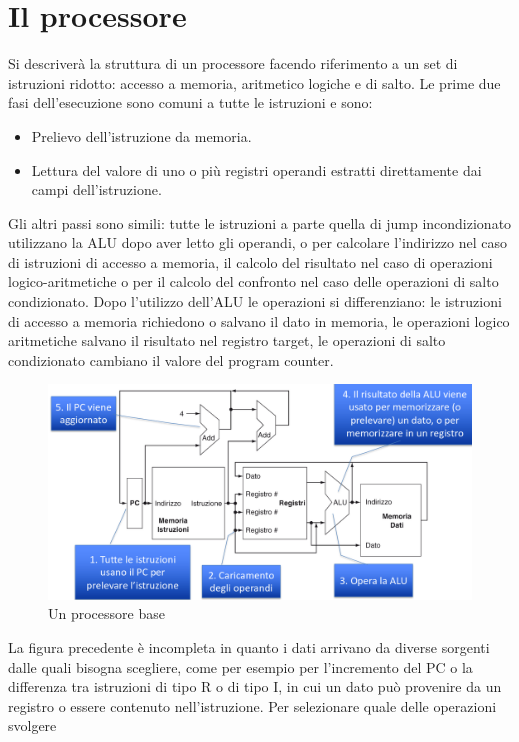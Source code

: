\chapter{Il processore}
Si descriver\`a la struttura di un processore facendo riferimento a un set di istruzioni ridotto: accesso a memoria, aritmetico logiche e di salto. Le prime due fasi
dell'esecuzione sono comuni a tutte le istruzioni e sono:
\begin{itemize}
\item Prelievo dell'istruzione da memoria.
\item Lettura del valore di uno o pi\`u registri operandi estratti direttamente dai campi dell'istruzione. 
\end{itemize}
Gli altri passi sono simili: tutte le istruzioni a parte quella di jump incondizionato utilizzano la ALU dopo aver letto gli operandi, o per calcolare l'indirizzo nel
caso di istruzioni di accesso a memoria, il calcolo del risultato nel caso di operazioni logico-aritmetiche o per il calcolo del confronto nel caso delle operazioni di 
salto condizionato. Dopo l'utilizzo dell'ALU le operazioni si differenziano: le istruzioni di accesso a memoria richiedono o salvano il dato in memoria, le operazioni
logico aritmetiche salvano il risultato nel registro target, le operazioni di salto condizionato cambiano il valore del program counter. 
\begin{figure}
  \includegraphics[scale=0.2]{Pictures/CPUBase.png}
  \caption{Un processore base}
  \label{fig:boat1}
\end{figure}
\newpage
La figura precedente \`e incompleta in quanto i dati arrivano da diverse sorgenti dalle quali bisogna scegliere, come per esempio per l'incremento del PC o la differenza
tra istruzioni di tipo R o di tipo I, in cui un dato pu\`o provenire da un registro o essere contenuto nell'istruzione. Per selezionare quale delle operazioni svolgere
